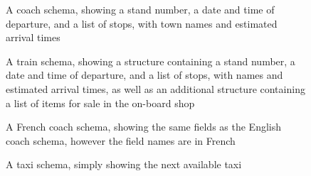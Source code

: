 \begin{figure}[h]

\caption[Example Schema for a Coach]{A coach schema, showing a stand number, a date and time of departure, and a list of stops, with town names and estimated arrival times}
\label{fig:coach-schema}
\end{figure}

\begin{figure}[h]

\caption[Example Schema for a Train]{A train schema, showing a structure containing a stand number, a date and time of departure, and a list of stops, with names and estimated arrival times, as well as an additional structure containing a list of items for sale in the on-board shop}
\label{fig:train-schema}
\end{figure}

\begin{figure}[h]

\caption[Example Schema for a French Coach]{A French coach schema, showing the same fields as the English coach schema, however the field names are in French}
\label{fig:french-coach-schema}
\end{figure}

\begin{figure}[h]

\caption[Example Schema for a Taxi]{A taxi schema, simply showing the next available taxi}
\label{fig:taxi-schema}
\end{figure}
